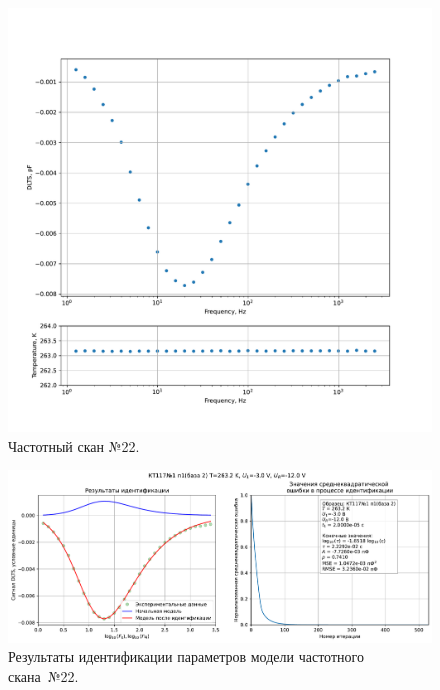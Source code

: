 \begin{figure}[!ht]
    \centering
    \includegraphics[width=1\textwidth]{../plots/КТ117№1_п1(база 2)_2500Гц-1Гц_1пФ_-10С_-3В-12В_100мВ_20мкс_шаг_0,1.pdf}
    \caption{Частотный скан №22.}
    \label{pic:frequency_scan_22}
\end{figure}

\begin{figure}[!ht]
    \centering
    \includegraphics[width=1\textwidth]{../plots/КТ117№1_п1(база 2)_2500Гц-1Гц_1пФ_-10С_-3В-12В_100мВ_20мкс_шаг_0,1_model.pdf}
    \caption{Результаты идентификации параметров модели частотного скана~№22.}
    \label{pic:frequency_scan_model22}
\end{figure}

\pagebreak


